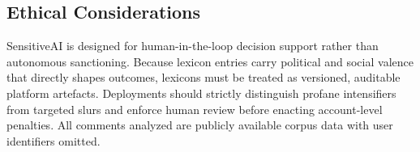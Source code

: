 \subsection{Ethical Considerations}
\label{sec:ethics}
SensitiveAI is designed for human-in-the-loop decision support rather than autonomous sanctioning. Because lexicon entries carry political and social valence that directly shapes outcomes, lexicons must be treated as versioned, auditable platform artefacts. Deployments should strictly distinguish profane intensifiers from targeted slurs and enforce human review before enacting account-level penalties. All comments analyzed are publicly available corpus data with user identifiers omitted.